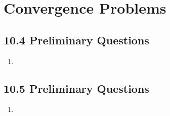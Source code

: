 \newpage %

\section{Convergence Problems}
\subsection{10.4 Preliminary Questions}
\begin{enumerate}
  \item
\end{enumerate}

\subsection{10.5 Preliminary Questions}
\begin{enumerate}
  \item
\end{enumerate}

